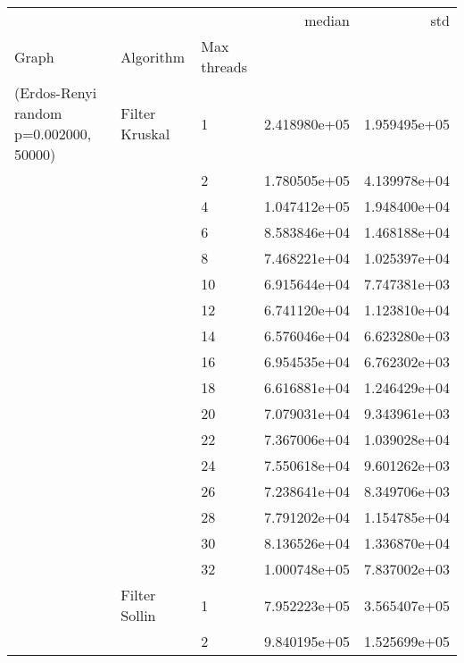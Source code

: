 \begin{tabular}{lllrr}
\toprule
                      &                     &    &        median &           std \\
Graph & Algorithm & Max threads &               &               \\
\midrule
(Erdos-Renyi random p=0.002000, 50000) & Filter Kruskal & 1  &  2.418980e+05 &  1.959495e+05 \\
                      &                     & 2  &  1.780505e+05 &  4.139978e+04 \\
                      &                     & 4  &  1.047412e+05 &  1.948400e+04 \\
                      &                     & 6  &  8.583846e+04 &  1.468188e+04 \\
                      &                     & 8  &  7.468221e+04 &  1.025397e+04 \\
                      &                     & 10 &  6.915644e+04 &  7.747381e+03 \\
                      &                     & 12 &  6.741120e+04 &  1.123810e+04 \\
                      &                     & 14 &  6.576046e+04 &  6.623280e+03 \\
                      &                     & 16 &  6.954535e+04 &  6.762302e+03 \\
                      &                     & 18 &  6.616881e+04 &  1.246429e+04 \\
                      &                     & 20 &  7.079031e+04 &  9.343961e+03 \\
                      &                     & 22 &  7.367006e+04 &  1.039028e+04 \\
                      &                     & 24 &  7.550618e+04 &  9.601262e+03 \\
                      &                     & 26 &  7.238641e+04 &  8.349706e+03 \\
                      &                     & 28 &  7.791202e+04 &  1.154785e+04 \\
                      &                     & 30 &  8.136526e+04 &  1.336870e+04 \\
                      &                     & 32 &  1.000748e+05 &  7.837002e+03 \\
                      & Filter Sollin & 1  &  7.952223e+05 &  3.565407e+05 \\
                      &                     & 2  &  9.840195e+05 &  1.525699e+05 \\

\end{tabular}
